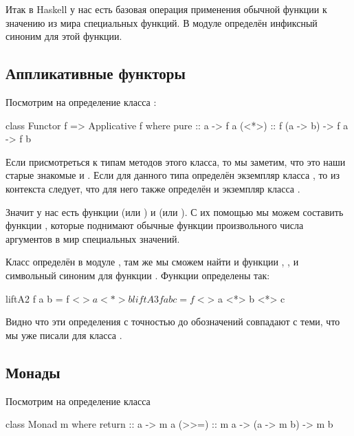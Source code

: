 Итак в Haskell у нас есть базовая операция 
применения обычной функции к значению из мира 
специальных функций. В модуле 
определён инфиксный синоним \In{<$>} для этой функции.

\subsection{Аппликативные функторы}

Посмотрим на определение класса 
:

\begin{code}
class Functor f => Applicative f where
        pure    :: a -> f a
        (<*>)   :: f (a -> b) -> f a -> f b
 \end{code}

Если присмотреться к типам методов этого класса, то
мы заметим, что это наши старые знакомые  и \In{$$}.
Если для данного типа  определён экземпляр класса
, то из контекста следует, что для него
также определён и экземпляр класса . 

Значит у нас есть функции  (или ) 
и \In{<*>} (или \In{$$}). С их помощью мы можем 
составить функции , которые поднимают обычные 
функции произвольного числа аргументов в мир специальных
значений. 

Класс  определён в модуле ,
там же мы сможем найти и функции , , 
и символьный синоним \In{<$>} для функции .
Функции  определены так:

\begin{code}
liftA2 f a b   = f <$> a <*> b
liftA3 f a b c = f <$> a <*> b <*> c
\end{code}

Видно что эти определения с точностью до обозначений 
совпадают с теми, что мы уже писали для класса .

\subsection{Монады}

Посмотрим на определение класса   

\begin{code}
class Monad m where
  return :: a -> m a
  (>>=)  :: m a -> (a -> m b) -> m b
\end{code}

